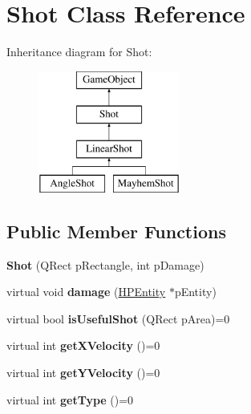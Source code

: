 \hypertarget{class_shot}{\section{Shot Class Reference}
\label{class_shot}
}
Inheritance diagram for Shot\-:\begin{figure}[H]
\begin{center}
\leavevmode
\includegraphics[height=4.000000cm]{class_shot}
\end{center}
\end{figure}
\subsection*{Public Member Functions}
\begin{DoxyCompactItemize}
\item 
\hypertarget{class_shot_a8fec158d22bc06cf7b8e4bc9c2328356}{{\bfseries Shot} (Q\-Rect p\-Rectangle, int p\-Damage)}\label{class_shot_a8fec158d22bc06cf7b8e4bc9c2328356}

\item 
\hypertarget{class_shot_a6f78a6d0f6e7e44619b0128c14ce5730}{virtual void {\bfseries damage} (\hyperlink{class_h_p_entity}{H\-P\-Entity} $\ast$p\-Entity)}\label{class_shot_a6f78a6d0f6e7e44619b0128c14ce5730}

\item 
\hypertarget{class_shot_aa8acb047c32e567e066e75782744de62}{virtual bool {\bfseries is\-Useful\-Shot} (Q\-Rect p\-Area)=0}\label{class_shot_aa8acb047c32e567e066e75782744de62}

\item 
\hypertarget{class_shot_a8cfb5cf554b6164f2dceef2e7263b8a0}{virtual int {\bfseries get\-X\-Velocity} ()=0}\label{class_shot_a8cfb5cf554b6164f2dceef2e7263b8a0}

\item 
\hypertarget{class_shot_adad108f4ef3c792dc09eeb60a32d7479}{virtual int {\bfseries get\-Y\-Velocity} ()=0}\label{class_shot_adad108f4ef3c792dc09eeb60a32d7479}

\item 
\hypertarget{class_shot_a3bf2af64550a0ee1d467bdec43ac6200}{virtual int {\bfseries get\-Type} ()=0}\label{class_shot_a3bf2af64550a0ee1d467bdec43ac6200}

\end{DoxyCompactItemize}

